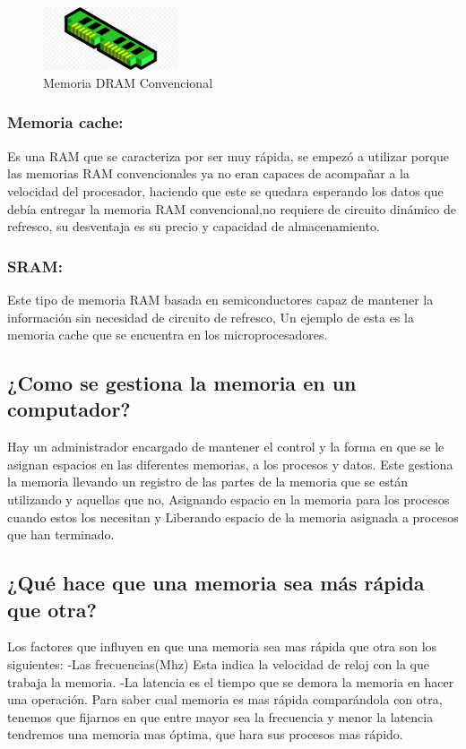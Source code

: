 \documentclass{article}
\begin{document}
\begin{figure}[h]
\includegraphics[width=4cm]{RAMM.png}
\centering
\caption{Memoria DRAM Convencional}
\label{fig:RAMM}
\end{figure}

\subsubsection{Memoria cache:}
Es una RAM que se caracteriza por ser muy rápida, se empezó a utilizar porque las memorias RAM convencionales ya no eran capaces de acompañar a la velocidad del procesador, haciendo que este se quedara esperando los datos que debía entregar la memoria RAM convencional,no requiere de circuito dinámico de refresco, su desventaja es su precio y capacidad de almacenamiento.
\subsubsection{SRAM:}
Este tipo de memoria RAM basada en semiconductores capaz de mantener la información sin necesidad de circuito de refresco, Un ejemplo de esta es la memoria cache que se encuentra en los microprocesadores.
\subsection{¿Como se gestiona la memoria en un computador?}
Hay un administrador encargado de mantener el control y la forma en que se le asignan espacios en las diferentes memorias, a los procesos y datos. Este gestiona la memoria llevando un registro de las partes de la memoria que se están utilizando y aquellas que no, Asignando espacio en la memoria para los procesos cuando estos los necesitan y Liberando espacio de la memoria asignada a procesos que han terminado. 
\subsection{¿Qué hace que una memoria sea más rápida que otra?}
Los factores que influyen en que una memoria sea mas rápida que otra son los siguientes:
-Las frecuencias(Mhz) Esta indica la velocidad de reloj con la que trabaja la memoria.
-La latencia es el tiempo que se demora la memoria en hacer una operación.
Para saber cual memoria es mas rápida comparándola con otra, tenemos que fijarnos en que entre mayor sea la frecuencia y menor la latencia tendremos una memoria mas óptima, que hara sus procesos mas rápido.
\end{document}
